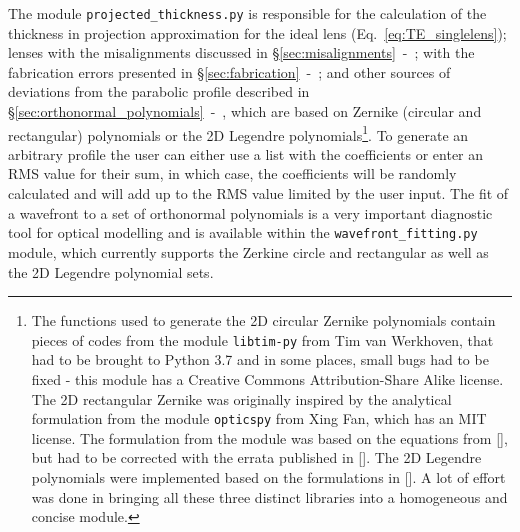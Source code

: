 \begin{refsection}
The module \texttt{projected\_thickness.py} is responsible for the calculation of the thickness in projection approximation for the ideal lens (Eq.~\ref{eq:TE_singlelens}); lenses with the misalignments discussed in \S\ref{sec:misalignments}~-~\textit{}; with the fabrication errors presented in \S\ref{sec:fabrication}~-~\textit{}; and other sources of deviations from the parabolic profile described in \S\ref{sec:orthonormal_polynomials}~-~\textit{}, which are based on Zernike (circular and rectangular) polynomials or the 2D Legendre polynomials\footnote{The functions used to generate the 2D circular Zernike polynomials contain pieces of codes from the module \texttt{libtim-py} from Tim van Werkhoven, that had to be brought to Python 3.7 and in some places, small bugs had to be fixed - this module has a Creative Commons Attribution-Share Alike
license. The 2D rectangular Zernike was originally inspired by the analytical formulation from the module \texttt{opticspy} from Xing Fan, which has an MIT license. The formulation from the module was based on the equations from [\cite{Mahajan2007}], but had to be corrected with the errata published in [\cite{Mahajan2012}]. The 2D Legendre polynomials were implemented based on the formulations in [\cite{Mahajan2010}]. A lot of effort was done in bringing all these three distinct libraries into a homogeneous and concise module.}. To generate an arbitrary profile the user can either use a list with the coefficients or enter an RMS value for their sum, in which case, the coefficients will be randomly calculated and will add up to the RMS value limited by the user input. The fit of a wavefront to a set of orthonormal polynomials is a very important diagnostic tool for optical modelling and is available within the \texttt{wavefront\_fitting.py} module, which currently supports the Zerkine circle and rectangular as well as the 2D Legendre polynomial sets.


\end{refsection}
